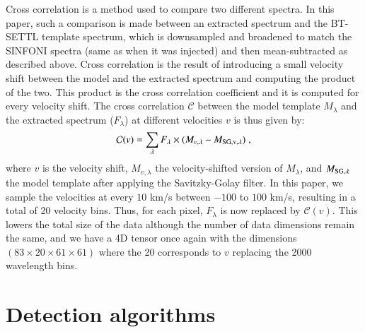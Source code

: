 \documentclass[referee]{aa} %
\begin{document}
Cross correlation is a method used to compare two different spectra.
In this paper, such a comparison is made between an extracted spectrum and the BT-SETTL template spectrum, which is downsampled and broadened to match the SINFONI spectra (same as when it was injected) and then mean-subtracted as described above.
Cross correlation is the result of introducing a small velocity shift between the model and the extracted spectrum and computing the product of the two.
This product is the cross correlation coefficient and it is computed for every velocity shift.
The cross correlation $\mathcal{C}$ between the model template $M_{\lambda}$ and the extracted spectrum ($F_{\lambda}$) at different velocities $v$ is thus given by:
\begin{equation}
    \mathcal{C}(v) = \sum\limits_{\lambda}F_{\rm{\lambda}}\times (M_{v,\lambda}-M_{\rm{SG},v,\lambda})  \; ,
    \label{eq:CC equation}
\end{equation}
where $v$ is the velocity shift, $M_{v,\lambda}$ the velocity-shifted version of $M_{\lambda}$, and $M_{\rm{SG},\lambda}$ the model template after applying the Savitzky-Golay filter.
In this paper, we sample the velocities at every $10$ km/s between $-100$ to $100$ km/s, resulting in a total of 20 velocity bins. Thus, for each pixel, $F_\lambda$ is now replaced by $\mathcal{C}(v)$. This lowers the total size of the data although the number of data dimensions remain the same, and we have a 4D tensor once again with the dimensions $\left(83\times20\times61\times61\right)$ where the 20 corresponds to $v$ replacing the 2000 wavelength bins.



\section{Detection algorithms}
\label{sec:mapbased}
\end{document}
